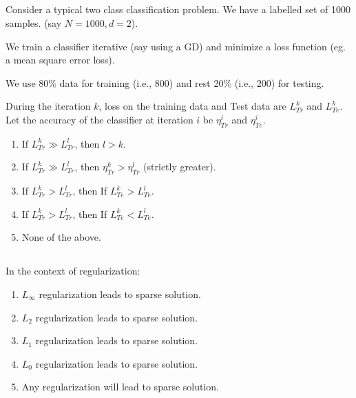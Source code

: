 \begin{frame}
\section{}
Consider a typical two class classification problem. We have a labelled set of 1000 samples. (say $N=1000, d=2$).

We train a classifier iterative (say using a GD) and minimize a loss function (eg. a mean square error loss).

We use 80\% data for training (i.e., 800) and rest 20\% (i.e., 200) for testing.

During the iteration $k$,  loss on the training data and Test data are $L_{Tr}^k$ and $L_{Te}^k$.  Let the accuracy of the classifier at iteration $i$ be $\eta_{Tr}^i$ and $\eta_{Te}^i$.
\begin{enumerate}
\item If $L^k_{Tr} \gg L^l_{Tr}$, then $l > k$.     %
\item If $L^k_{Tr} \gg L^l_{Tr}$, then $\eta_{Tr}^k > \eta_{Tr}^l$ (strictly greater).
\item If $L^k_{Tr} > L^l_{Tr}$, then If $L^k_{Te} > L^l_{Te}$.
\item If $L^k_{Tr} > L^l_{Tr}$, then If $L^k_{Te} < L^l_{Te}$.
\item None of the above.   %
\end{enumerate}
\end{frame}

\begin{frame}
\section{}
In the context of regularization:
\begin{enumerate}
\item $L_\infty$ regularization leads to sparse solution.
\item $L_2$ regularization leads to sparse solution.
\item $L_1$ regularization leads to sparse solution.        %
\item $L_0$ regularization leads to sparse solution.        %
\item Any regularization will lead to sparse solution.
\end{enumerate}
\end{frame}

